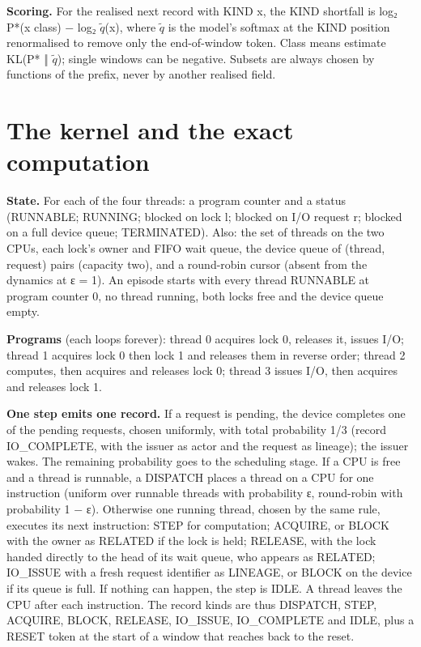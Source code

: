\documentclass[10pt]{article}
\begin{document}
\textbf{Scoring.} For the realised next record with KIND x, the KIND shortfall is log₂ P*(x \textbar{} class) − log₂ \(\tilde{q}\)(x), where \(\tilde{q}\) is
the model's softmax at the KIND position renormalised to remove only the end-of-window token. Class means estimate
KL(P* ‖ \(\tilde{q}\)); single windows can be negative. Subsets are always chosen by functions of the prefix, never by another
realised field.

\hypertarget{the-kernel-and-the-exact-computation}{%
\section{The kernel and the exact computation}\label{the-kernel-and-the-exact-computation}}

\textbf{State.} For each of the four threads: a program counter and a status (RUNNABLE; RUNNING; blocked on lock l; blocked
on I/O request r; blocked on a full device queue; TERMINATED). Also: the set of threads on the two CPUs, each lock's
owner and FIFO wait queue, the device queue of (thread, request) pairs (capacity two), and a round-robin cursor (absent
from the dynamics at ε = 1). An episode starts with every thread RUNNABLE at program counter 0, no thread running, both
locks free and the device queue empty.

\textbf{Programs} (each loops forever): thread 0 acquires lock 0, releases it, issues I/O; thread 1 acquires lock 0 then
lock 1 and releases them in reverse order; thread 2 computes, then acquires and releases lock 0; thread 3 issues I/O,
then acquires and releases lock 1.

\textbf{One step emits one record.} If a request is pending, the device completes one of the pending requests, chosen
uniformly, with total probability 1/3 (record IO\_COMPLETE, with the issuer as actor and the request as lineage); the
issuer wakes. The remaining probability goes to the scheduling stage. If a CPU is free and a thread is runnable, a
DISPATCH places a thread on a CPU for one instruction (uniform over runnable threads with probability ε, round-robin
with probability 1 − ε). Otherwise one running thread, chosen by the same rule, executes its next instruction: STEP for computation; ACQUIRE, or
BLOCK with the owner as RELATED if the lock is held; RELEASE, with the lock handed directly to the head of its wait
queue, who appears as RELATED; IO\_ISSUE with a fresh request identifier as LINEAGE, or BLOCK on the device if its queue is full.
If nothing can happen, the step is IDLE. A thread leaves the CPU after each instruction. The record kinds are thus
DISPATCH, STEP, ACQUIRE, BLOCK, RELEASE, IO\_ISSUE, IO\_COMPLETE and IDLE, plus a RESET token at the start of a window that
reaches back to the reset.
\end{document}
